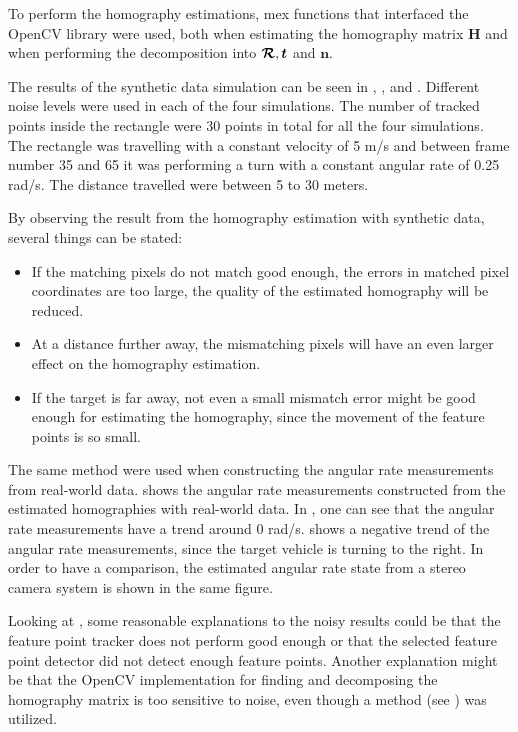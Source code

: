 To perform the homography estimations, \matlab mex functions that interfaced the OpenCV library \cite{mexopencv} were used, both when estimating the homography matrix $\bm{H}$ and when performing the decomposition into $\bm{\mathcal{R}}, \bm{t}$ and $\bm{n}$.

The results of the synthetic data simulation can be seen in , ,  and .
Different noise levels were used in each of the four simulations.
The number of tracked points inside the rectangle were 30 points in total for all the four simulations.
The rectangle was travelling with a constant velocity of 5 m/s and between frame number 35 and 65 it was performing a turn with a constant angular rate of 0.25 rad/s.
The distance travelled were between 5 to 30 meters.

By observing the result from the homography estimation with synthetic data, several things can be stated:
\begin{itemize}
	\item If the matching pixels do not match good enough, \ie the errors in matched pixel coordinates are too large, the quality of the estimated homography will be reduced.
	\item At a distance further away, the mismatching pixels will have an even larger effect on the homography estimation.
	\item If the target is far away, not even a small mismatch error might be good enough for estimating the homography, since the movement of the feature points is so small.
\end{itemize}

The same method were used when constructing the angular rate measurements from real-world data.
 shows the angular rate measurements constructed from the estimated homographies with real-world data.
In , one can see that the angular rate measurements have a trend around 0 rad/s.
 shows a negative trend of the angular rate measurements, since the target vehicle is turning to the right.
In order to have a comparison, the estimated angular rate state from a stereo camera system is shown in the same figure.

Looking at , some reasonable explanations to the noisy results could be that the feature point tracker does not perform good enough or that the selected feature point detector did not detect enough feature points.
Another explanation might be that the OpenCV implementation for finding and decomposing the homography matrix is too sensitive to noise, even though a \abbrRANSAC method (see ) was utilized.

